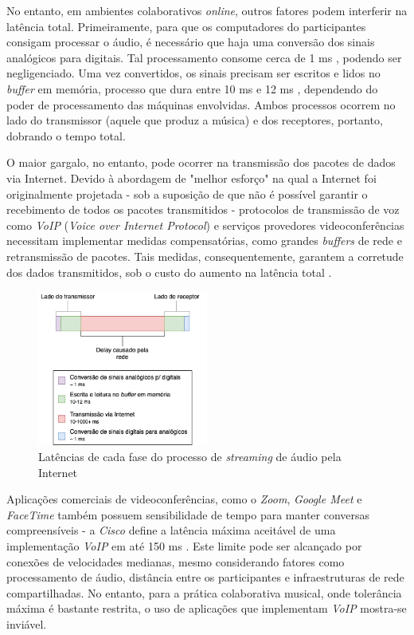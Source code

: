 No entanto, em ambientes colaborativos \textit{online}, outros fatores podem interferir na latência total. Primeiramente, para que os computadores do participantes consigam processar o áudio, é necessário que haja uma conversão dos sinais analógicos para digitais. Tal processamento consome cerca de 1 ms \cite{how_low_can_you_go}, podendo ser negligenciado. Uma vez convertidos, os sinais precisam ser escritos e lidos no \textit{buffer} em memória, processo que dura entre 10 ms e 12 ms \cite{how_low_can_you_go}, dependendo do poder de processamento das máquinas envolvidas. Ambos processos ocorrem no lado do transmissor (aquele que produz a música) e dos receptores, portanto, dobrando o tempo total.

O maior gargalo, no entanto, pode ocorrer na transmissão dos pacotes de dados via Internet. Devido à abordagem de "melhor esforço" na qual a Internet foi originalmente projetada - sob a suposição de que não é possível garantir o recebimento de todos os pacotes transmitidos - protocolos de transmissão de voz como \textit{VoIP} (\textit{Voice over Internet Protocol}) e serviços provedores videoconferências necessitam implementar medidas compensatórias, como grandes \textit{buffers} de rede e retransmissão de pacotes. Tais medidas, consequentemente, garantem a corretude dos dados transmitidos, sob o custo do aumento na latência total \cite{carot_low_latency}.

\begin{figure}[htbp]
\centering
\includegraphics[width=0.5\textwidth]{images/streaming-latency.png}
\caption{Latências de cada fase do processo de \textit{streaming} de áudio pela Internet}
\label{fig:streaming_latencies}
\end{figure}

Aplicações comerciais de videoconferências, como o \textit{Zoom}, \textit{Google Meet} e \textit{FaceTime} também  possuem sensibilidade de tempo para manter conversas compreensíveis - a \textit{Cisco} define a latência máxima aceitável de uma implementação \textit{VoIP} em até 150 ms \cite{cisco}. Este limite pode ser alcançado por conexões de velocidades medianas, mesmo considerando fatores como processamento de áudio, distância entre os participantes e infraestruturas de rede compartilhadas. No entanto, para a prática colaborativa musical, onde tolerância máxima é bastante restrita, o uso de aplicações que implementam \textit{VoIP} mostra-se inviável.

